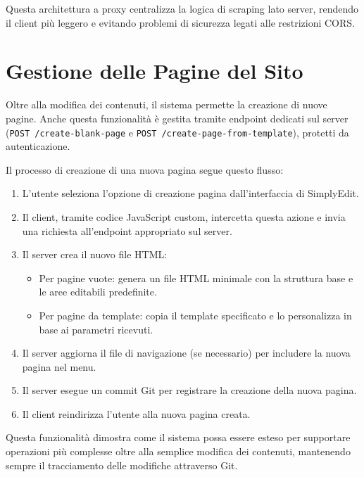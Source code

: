 Questa architettura a proxy centralizza la logica di scraping lato server, rendendo il client più leggero e evitando problemi di sicurezza legati alle restrizioni CORS.

\section{Gestione delle Pagine del Sito}
Oltre alla modifica dei contenuti, il sistema permette la creazione di nuove pagine. Anche questa funzionalità è gestita tramite endpoint dedicati sul server (\texttt{POST /create-blank-page} e \texttt{POST /create-page-from-template}), protetti da autenticazione.

Il processo di creazione di una nuova pagina segue questo flusso:
\begin{enumerate}
    \item L'utente seleziona l'opzione di creazione pagina dall'interfaccia di SimplyEdit.
    \item Il client, tramite codice JavaScript custom, intercetta questa azione e invia una richiesta all'endpoint appropriato sul server.
    \item Il server crea il nuovo file HTML:
    \begin{itemize}
        \item Per pagine vuote: genera un file HTML minimale con la struttura base e le aree editabili predefinite.
        \item Per pagine da template: copia il template specificato e lo personalizza in base ai parametri ricevuti.
    \end{itemize}
    \item Il server aggiorna il file di navigazione (se necessario) per includere la nuova pagina nel menu.
    \item Il server esegue un commit Git per registrare la creazione della nuova pagina.
    \item Il client reindirizza l'utente alla nuova pagina creata.
\end{enumerate}

Questa funzionalità dimostra come il sistema possa essere esteso per supportare operazioni più complesse oltre alla semplice modifica dei contenuti, mantenendo sempre il tracciamento delle modifiche attraverso Git.